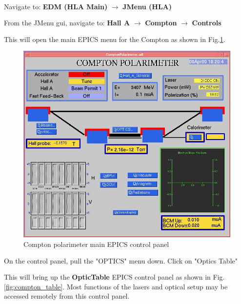 \\

Navigate to:  {\bf EDM (HLA Main)}  $\rightarrow$  {\bf JMenu (HLA)}

From the JMenu gui, navigate to: {\bf Hall A}  $\rightarrow$  {\bf Compton} $\rightarrow$  {\bf Controls}


This will open the main EPICS menu for the Compton as shown in Fig.\ref{fig:compton_epicsall}.
 \begin{figure}[htp]
    \begin{center}
        \includegraphics*[angle=0,width=\textwidth]{compton_epicsall}
    \end{center}
    \caption[compton:epics main control]{Compton polarimeter main EPICS control panel}
    \label{fig:compton_epicsall}
 \end{figure}

On the control panel, pull the "OPTICS" menu down. Click on "Optics Table" 

	This will bring up the {\bf OpticTable} EPICS control panel as shown in Fig.\ref{fig:compton_table}. Most functions of the lasers and optical setup may be accessed remotely from this  control panel. 


